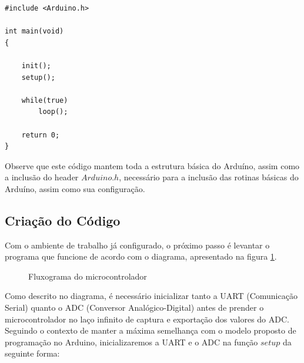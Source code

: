 \begin{multicols}{2}
\begin{lstlisting}[basicstyle=\ttfamily,numbers=none,caption={[Exemplo da função main()]Código de exemplo da função main()}]
#include <Arduino.h>

int main(void)
{

	init();
	setup();

	while(true) 
		loop();

	return 0;
}
\end{lstlisting}

Observe que este código mantem toda a estrutura básica do Arduíno, assim como a inclusão do header $Arduino.h$, necessário para a inclusão das rotinas básicas do Arduíno, assim como sua configuração.

\subsection{Criação do Código}\label{making_arduino}

Com o ambiente de trabalho já configurado, o próximo passo é levantar o programa que funcione de acordo com o diagrama, apresentado na figura \ref{flux_micro}.

\begin{figure}[H]
\begin{center}
\end{center}
\caption{Fluxograma do microcontrolador}
\label{flux_micro}
\end{figure}

Como descrito no diagrama, é necessário inicializar tanto a UART (Comunicação Serial) quanto o ADC (Conversor Analógico-Digital) antes de prender o microcontrolador no laço infinito de captura e exportação dos valores do ADC. Seguindo o contexto de manter a máxima semelhança com o modelo proposto de programação no Arduino, inicializaremos a UART e o ADC na função $setup$ da seguinte forma:

\begin{lstlisting}[basicstyle=\ttfamily,numbers=none,caption={[setup()]Código da função setup()}]


\end{lstlisting}
\end{multicols}
